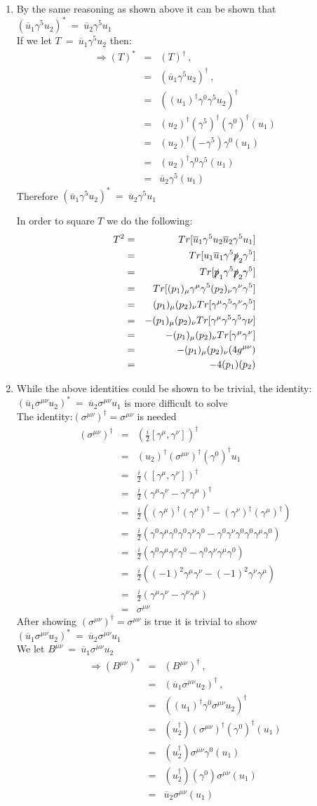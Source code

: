 \documentclass[12pt]{article}
\def \bea{\begin{eqnarray}}
\def \eea{\end{eqnarray}}
\def \nn{ }
\def \nl{\nn \\}
\def \ou{\overline{u}}
\def \ga{\gamma}
\def \si{\sigma}
\begin{document}
\begin{enumerate}
\item By the same reasoning as shown above it can be shown that $(\ou_1 \ga^5 u_2)^* ~=~ \ou_2 \ga^5 u_1$ \nl
If we let $T ~=~ \ou_1\ga^5 u_2$ then:
\bea
\Rightarrow (T)^* &=& (T)^\dag ~,~~ \\\nonumber
&=& (\ou_1\ga^5 u_2)^\dag ~,~~ \nl\nonumber
&=& ((u_1)^\dag\ga^0\ga^5 u_2)^\dag \nl\nonumber
&=& (u_2)^\dag(\ga^5)^\dag (\ga^0)^\dag(u_1)\nl\nonumber
&=& (u_2)^\dag(-\ga^5) \ga^0(u_1)\nl\nonumber
&=& (u_2)^\dag \ga^0\ga^5(u_1)\nl
&=& \ou_2\ga^5(u_1) 
\eea 
Therefore  $(\ou_1 \ga^5 u_2)^* ~=~ \ou_2 \ga^5 u_1$

In order to square $T$ we do the following: 
\bea 
T^2&=& Tr[\ou_1 \ga^5 u_2\ou_2 \ga^5 u_1] \\ \nonumber
&=& Tr[u_1 \ou_1 \ga^5 \slashed{p}_2 \ga^5] \nl\nonumber
&=& Tr[\slashed{p}_1 \ga^5 \slashed{p}_2 \ga^5] \nl\nonumber
&=& Tr[(p_1)_\mu \ga^\mu \ga^5 (p_2)_\nu \ga^\nu \ga^5] \nl\nonumber
&=& (p_1)_\mu(p_2)_\nu Tr[\ga^\mu\ga^5\ga^\nu\ga^5] \nl\nonumber
&=& -(p_1)_\mu(p_2)_\nu Tr[\ga^\mu\ga^5\ga^5\ga\nu]\nl\nonumber
&=& -(p_1)_\mu(p_2)_\nu Tr[\ga^\mu\ga^\nu]\nl\nonumber
&=& -(p_1)_\mu(p_2)_\nu (4g^{\mu\nu})\nl\nonumber
&=& -4(p_1)(p_2) \nl
\eea

\item While the above identities could be shown to be trivial, the identity: $(\ou_1 \si^{\mu\nu} u_2)^* ~=~\ou_2 \si^{\mu\nu} u_1$ is more difficult to solve \nl
The identity:$(\si^{\mu\nu})^\dag =\si^{\mu\nu}$ is needed
\bea 
(\si^{\mu\nu})^\dag &=& (\frac{i}{2}[\ga^\mu,\ga^\nu])^\dag \\\nonumber
&=&(u_2)^\dag (\si^{\mu\nu})^\dag (\ga^0)^\dag u_1 \nl \nonumber
&=& \frac{i}{2}([\ga^\mu,\ga^\nu])^\dag\nl
&=& \frac{i}{2}(\ga^\mu\ga^\nu-\ga^\nu\ga^\mu)^\dag \nl\nonumber
&=& \frac{i}{2}((\ga^\mu)^\dag(\ga^\nu)^\dag-(\ga^\nu)^\dag(\ga^\mu)^\dag) \nl\nonumber
&=& \frac{i}{2}(\ga^0\ga^\mu\ga^0\ga^0\ga^\nu\ga^0-\ga^0\ga^\nu\ga^0\ga^0\ga^\mu\ga^0)\nl\nonumber
&=& \frac{i}{2}(\ga^0\ga^\mu\ga^\nu\ga^0-\ga^0\ga^\nu \ga^\mu\ga^0)\nl\nonumber
&=& \frac{i}{2}((-1)^2\ga^\mu\ga^\nu-(-1)^2\ga^\nu \ga^\mu) \nl\nonumber
&=& \frac{i}{2}(\ga^\mu\ga^\nu-\ga^\nu \ga^\mu)\nl
&=& \si^{\mu\nu}
\eea 
After showing $(\si^{\mu\nu})^\dag =\si^{\mu\nu}$ is true it is trivial to show $(\ou_1 \si^{\mu\nu} u_2)^* ~=~\ou_2 \si^{\mu\nu} u_1$ \nl
We let $B^{\mu\nu} ~=~ \ou_1 \si^{\mu\nu} u_2$
\bea
\Rightarrow (B^{\mu\nu})^* &=& (B^{\mu\nu})^\dag ~,~~ \\\nonumber
&=& (\ou_1 \si^{\mu\nu} u_2)^\dag ~,~~ \nl\nonumber
&=& ((u_1)^\dag \ga^0 \si^{\mu\nu} u_2)^\dag \nl\nonumber
&=& (u_2^\dag)(\si^{\mu\nu})^\dag (\ga^0)^\dag(u_1)\nl\nonumber
&=& (u_2^\dag)\si^{\mu\nu}\ga^0(u_1)\nl\nonumber
&=& (u_2^\dag)(\ga^0)\si^{\mu\nu}(u_1)\nl
&=& \ou_2 \si^{\mu\nu}(u_1)
\eea 


\end{enumerate}
\end{document}
